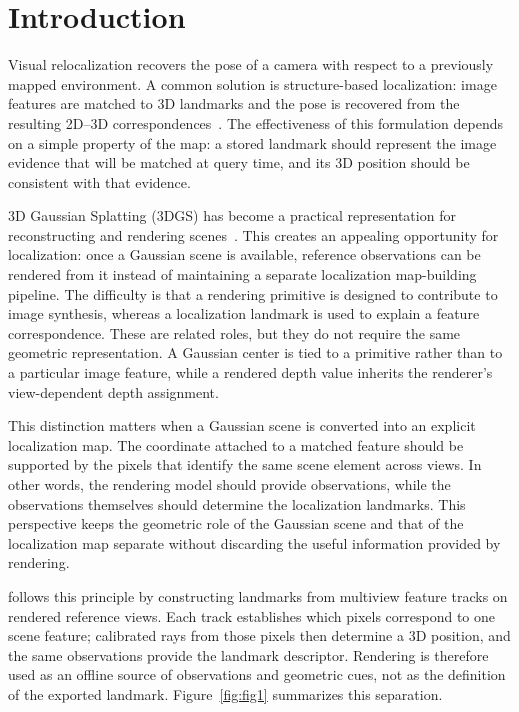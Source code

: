 \section{Introduction}
\label{sec:introduction}
Visual relocalization recovers the pose of a camera with respect to a previously mapped environment. A common solution is structure-based localization: image features are matched to 3D landmarks and the pose is recovered from the resulting 2D--3D correspondences~\cite{sarlin2019hloc,lepetit2009epnp}. The effectiveness of this formulation depends on a simple property of the map: a stored landmark should represent the image evidence that will be matched at query time, and its 3D position should be consistent with that evidence.



3D Gaussian Splatting (3DGS) has become a practical representation for reconstructing and rendering scenes~\cite{kerbl2023gaussian,huang2024_2dgs,guedon2025matcha}. This creates an appealing opportunity for localization: once a Gaussian scene is available, reference observations can be rendered from it instead of maintaining a separate localization map-building pipeline. The difficulty is that a rendering primitive is designed to contribute to image synthesis, whereas a localization landmark is used to explain a feature correspondence. These are related roles, but they do not require the same geometric representation. A Gaussian center is tied to a primitive rather than to a particular image feature, while a rendered depth value inherits the renderer's view-dependent depth assignment.

This distinction matters when a Gaussian scene is converted into an explicit localization map. The coordinate attached to a matched feature should be supported by the pixels that identify the same scene element across views. In other words, the rendering model should provide observations, while the observations themselves should determine the localization landmarks. This perspective keeps the geometric role of the Gaussian scene and that of the localization map separate without discarding the useful information provided by rendering.

\method{} follows this principle by constructing landmarks from multiview feature tracks on rendered reference views. Each track establishes which pixels correspond to one scene feature; calibrated rays from those pixels then determine a 3D position, and the same observations provide the landmark descriptor. Rendering is therefore used as an offline source of observations and geometric cues, not as the definition of the exported landmark. Figure~\ref{fig:fig1} summarizes this separation.

